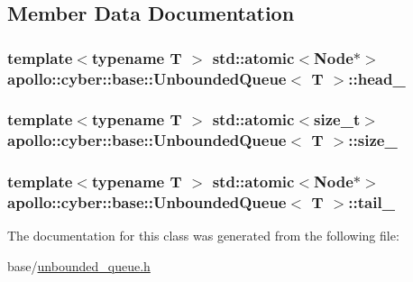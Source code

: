 \subsection{Member Data Documentation}
\hypertarget{classapollo_1_1cyber_1_1base_1_1UnboundedQueue_a7c0a5f75842513dc8d24006b1b8a3eae}{
\subsubsection[{head\-\_\-}]{\setlength{\rightskip}{0pt plus 5cm}template$<$typename T $>$ std\-::atomic$<${\bf Node}$\ast$$>$ {\bf apollo\-::cyber\-::base\-::\-Unbounded\-Queue}$<$ T $>$\-::head\-\_\-\hspace{0.3cm}{\ttfamily [private]}}}\label{classapollo_1_1cyber_1_1base_1_1UnboundedQueue_a7c0a5f75842513dc8d24006b1b8a3eae}
\hypertarget{classapollo_1_1cyber_1_1base_1_1UnboundedQueue_af8a71c42222607d17ed82706ca166e08}{
\subsubsection[{size\-\_\-}]{\setlength{\rightskip}{0pt plus 5cm}template$<$typename T $>$ std\-::atomic$<$size\-\_\-t$>$ {\bf apollo\-::cyber\-::base\-::\-Unbounded\-Queue}$<$ T $>$\-::size\-\_\-\hspace{0.3cm}{\ttfamily [private]}}}\label{classapollo_1_1cyber_1_1base_1_1UnboundedQueue_af8a71c42222607d17ed82706ca166e08}
\hypertarget{classapollo_1_1cyber_1_1base_1_1UnboundedQueue_a80ad0d76375f5c6d12108e93eaecb315}{
\subsubsection[{tail\-\_\-}]{\setlength{\rightskip}{0pt plus 5cm}template$<$typename T $>$ std\-::atomic$<${\bf Node}$\ast$$>$ {\bf apollo\-::cyber\-::base\-::\-Unbounded\-Queue}$<$ T $>$\-::tail\-\_\-\hspace{0.3cm}{\ttfamily [private]}}}\label{classapollo_1_1cyber_1_1base_1_1UnboundedQueue_a80ad0d76375f5c6d12108e93eaecb315}


The documentation for this class was generated from the following file\-:\begin{DoxyCompactItemize}
\item 
base/\hyperlink{unbounded__queue_8h}{unbounded\-\_\-queue.\-h}\end{DoxyCompactItemize}
